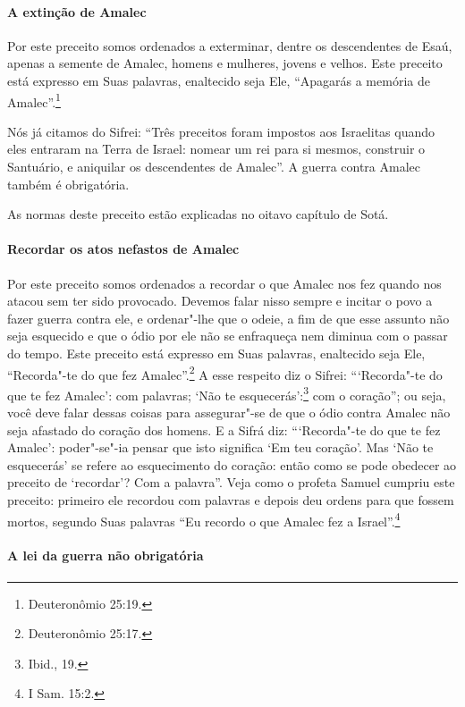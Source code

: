 \begin{multicols}{2}
\paragraph{A extinção de Amalec\starr}

Por este preceito somos ordenados a exterminar, dentre os descendentes
de Esaú, apenas a semente de Amalec\starr, homens e mulheres, jovens e
velhos. Este preceito está expresso em Suas palavras, enaltecido seja
Ele, ``Apagarás a memória de Amalec\starr''.\footnote{Deuteronômio 25:19.}

Nós já citamos do Sifrei\starr: ``Três preceitos foram impostos aos
Israelitas quando eles entraram na Terra de Israel: nomear um rei para
si mesmos, construir o Santuário, e aniquilar os descendentes de
Amalec\starr''. A guerra contra Amalec\starr{} também é obrigatória.

As normas deste preceito estão explicadas no oitavo capítulo de Sotá\starr.

\paragraph{Recordar os atos nefastos de Amalec\starr}

Por este preceito somos ordenados a recordar o que Amalec\starr{} nos fez quando
nos atacou sem ter sido provocado. Devemos falar nisso sempre e incitar
o povo a fazer guerra contra ele, e ordenar"-lhe que o odeie, a fim de
que esse assunto não seja esquecido e que o ódio por ele não se
enfraqueça nem diminua com o passar do tempo. Este preceito está
expresso em Suas palavras, enaltecido seja Ele, ``Recorda"-te do que fez
Amalec\starr''.\footnote{Deuteronômio 25:17.} A esse respeito diz o Sifrei\starr:
```Recorda"-te do que te fez Amalec\starr': com palavras; `Não te esquecerás':\footnote{Ibid., 19.} com o coração''; ou seja, você deve falar dessas coisas
para assegurar"-se de que o ódio contra Amalec\starr{} não seja afastado do
coração dos homens. E a Sifrá\starr{} diz: ```Recorda"-te do que te fez Amalec\starr':
poder"-se"-ia pensar que isto significa `Em teu coração'. Mas `Não te
esquecerás' se refere
ao esquecimento do coração: então como se pode obedecer ao preceito de
`recordar'? Com a palavra''. Veja como o profeta Samuel cumpriu este
preceito:
primeiro ele recordou com palavras e depois deu ordens para que fossem
mortos, segundo Suas palavras ``Eu recordo o que Amalec\starr{} fez a
Israel''.\footnote{I Sam. 15:2.}

\paragraph{A lei da guerra não obrigatória}


\end{multicols}
